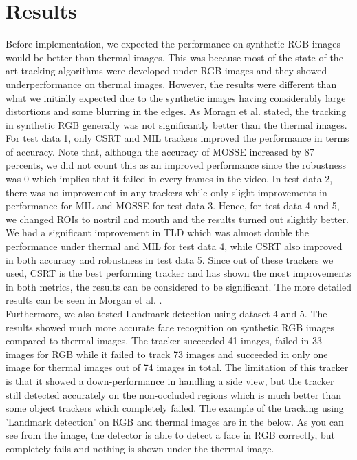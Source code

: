 \documentclass[conference]{IEEEtran}
\begin{document}
\section{Results}
Before implementation, we expected the performance on synthetic RGB images would be better than thermal images. This was because most of the state-of-the-art tracking algorithms were developed under RGB images and they showed underperformance on thermal images. However, the results were different than what we initially expected due to the synthetic images having considerably large distortions and some blurring in the edges. As Moragn et al. \cite{b20} stated, the tracking in synthetic RGB generally was not significantly better than the thermal images. For test data 1, only CSRT and MIL trackers improved the performance in terms of accuracy. Note that, although the accuracy of MOSSE increased by 87 percents, we did not count this as an improved performance since the robustness was 0 which implies that it failed in every frames in the video. In test data 2, there was no improvement in any trackers while only slight improvements in performance for MIL and MOSSE for test data 3. Hence, for test data 4 and 5, we changed ROIs to nostril and mouth and the results turned out slightly better. We had a significant improvement in TLD which was almost double the performance under thermal and MIL for test data 4, while CSRT also improved in both accuracy and robustness in test data 5. Since out of these trackers we used, CSRT is the best performing tracker and has shown the most improvements in both metrics, the results can be considered to be significant. The more detailed results can be seen in Morgan et al. \cite{b20}.\\
Furthermore, we also tested Landmark detection using dataset 4 and 5. The results showed much more accurate face recognition on synthetic RGB images compared to thermal images. The tracker succeeded 41 images, failed in 33 images for RGB while it failed to track 73 images and succeeded in only one image for thermal images out of 74 images in total. The limitation of this tracker is that it showed a down-performance in handling a side view, but the tracker still detected accurately on the non-occluded regions which is much better than some object trackers which completely failed. The example of the tracking using ’Landmark detection’ \cite{b21} on RGB and thermal images are in the below. As you can see from the image, the detector is able to detect a face in RGB correctly, but completely fails and nothing is shown under the thermal image.
\end{document}
